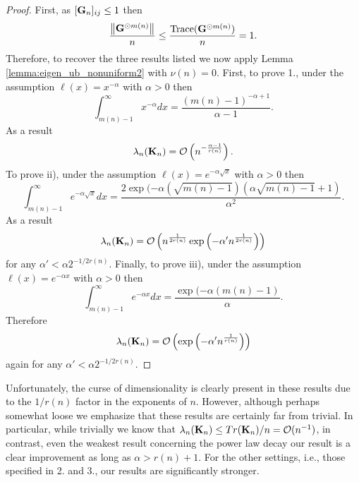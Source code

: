 \begin{proof}
    First, as $[\mathbf{G}_n]_{ij} \leq 1$ then
    \[
    \frac{\left\lVert\mathbf{G}^{\odot m(n)}\right\rVert}{n} \leq \frac{\text{Trace}(\mathbf{G}^{\odot m(n)})}{n} = 1. 
    \]
    Therefore, to recover the three results listed we now apply Lemma \ref{lemma:eigen_ub_nonuniform2} with $\nu(n) = 0$. First, to prove 1., under the assumption $\ell(x) = x^{-\alpha}$ with $\alpha > 0$ then
    \[
        \int_{m(n)-1}^{\infty} x^{-\alpha} dx =  \frac{(m(n) - 1)^{-\alpha+1}}{\alpha-1}. 
    \]
    As a result
    \[
    \lambda_{n}(\mathbf{K}_{n}) =\mathcal{O}\left(n^{-\frac{\alpha-1}{r(n)}}\right).
    \] 
    To prove ii), under the assumption $\ell(x) = e^{-\alpha \sqrt{x}}$ with $\alpha > 0$ then
    \[
        \int_{m(n)-1}^{\infty}  e^{-\alpha \sqrt{x}} dx =  \frac{2\exp(-\alpha(\sqrt{ m(n)-1})(\alpha \sqrt{m(n) - 1} + 1)}{\alpha^2}. 
    \]
    As a result
    \[
    \lambda_{n}(\mathbf{K}_{n}) = \mathcal{O} \left(n^{\frac{1}{2r(n)}} \exp \left(-\alpha' n^{\frac{1}{2r(n)}} \right) \right)
    \] 
    for any $\alpha' < \alpha 2^{-1/2r(n)}$. Finally, to prove iii), under the assumption $\ell(x) = e^{-\alpha x}$ with $\alpha > 0$ then
    \[
        \int_{m(n)-1}^{\infty}  e^{-\alpha x} dx =  \frac{\exp(-\alpha( m(n)-1)}{\alpha}.
    \]
    Therefore
    \[
    \lambda_{n}(\mathbf{K}_n) = \mathcal{O}\left(\exp\left(-\alpha' n^{\frac{1}{r(n)}}\right)\right)
    \]
    again for any $\alpha' < \alpha 2^{-1/2r(n)}$.
\end{proof}

Unfortunately, the curse of dimensionality is clearly present in these results due to the $1/r(n)$ factor in the exponents of $n$. However, although perhaps somewhat loose we emphasize that these results are certainly far from trivial. In particular, while trivially we know that $\lambda_n(\mathbf{K}_n) \leq Tr(\mathbf{K}_n) / n = \mathcal{O}(n^{-1})$, in contrast, even the weakest result concerning the power law decay our result is a clear improvement as long as $\alpha> r(n)+1$. For the other settings, i.e., those specified in 2. and 3., our results are significantly stronger.

